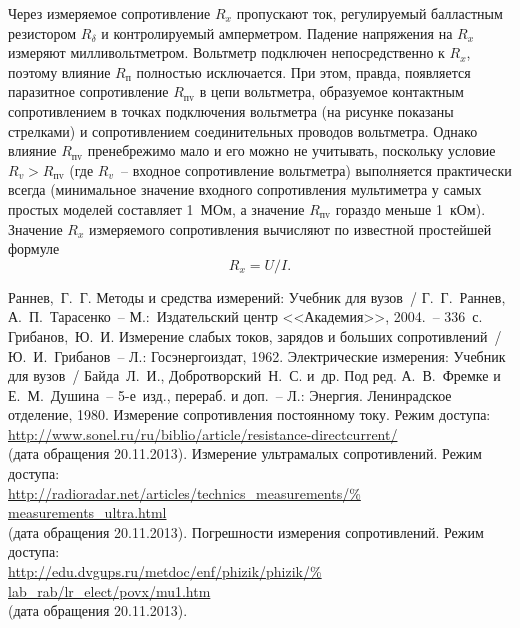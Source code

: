 \documentclass[pscyr]{hedwork}
\begin{document}
  Через измеряемое сопротивление \( R_x \) пропускают ток, регулируемый
  балластным резистором \( R_\delta \) и контролируемый амперметром. Падение
  напряжения на \( R_x \) измеряют милливольтметром. Вольтметр подключен
  непосредственно к \( R_x \), поэтому влияние \( R_\text{п} \) полностью
  исключается. При этом, правда, появляется паразитное сопротивление
  \( R_\text{пv} \) в цепи вольтметра, образуемое контактным сопротивлением в
  точках подключения вольтметра (на рисунке показаны стрелками) и сопротивлением
  соединительных проводов вольтметра. Однако влияние \( R_\text{пv} \)
  пренебрежимо мало и его можно не учитывать, поскольку условие
  \( R_v > R_\text{пv} \) (где \( R_v \)~-- входное сопротивление вольтметра)
  выполняется практически всегда (минимальное значение входного сопротивления
  мультиметра у самых простых моделей составляет 1~МОм, а значение
  \( R_\text{пv} \) гораздо меньше 1~кОм). Значение \( R_x \) измеряемого
  сопротивления вычисляют по известной простейшей формуле
  \[
    R_x = U / I.
  \]

  \pagebreak

  \begin{thebibliography}{9}
     Раннев,~Г.~Г. Методы и средства измерений: Учебник для вузов~/
      Г.~Г.~Раннев, А.~П.~Тарасенко~-- М.:~Издательский центр <<Академия>>,
      2004.~-- 336~с.
     Грибанов,~Ю.~И. Измерение слабых токов, зарядов и больших
      сопротивлений~/ Ю.~И.~Грибанов~-- Л.: Госэнергоиздат, 1962.
     Электрические измерения: Учебник для вузов~/ Байда~Л.~И.,
      Добротворский~Н.~С. и~др. Под ред. А.~В.~Фремке и Е.~М.~Душина~--
      5-е~изд., перераб. и доп.~-- Л.: Энергия. Ленинрадское отделение, 1980.
     Измерение сопротивления постоянному току. Режим доступа:\\
      \url{http://www.sonel.ru/ru/biblio/article/resistance-directcurrent/}\\
      (дата обращения 20.11.2013).
     Измерение ультрамалых сопротивлений. Режим доступа:\\
      \url{http://radioradar.net/articles/technics_measurements/%
      measurements_ultra.html}\\
      (дата обращения 20.11.2013).
     Погрешности измерения сопротивлений. Режим доступа:\\
      \url{http://edu.dvgups.ru/metdoc/enf/phizik/phizik/%
      lab_rab/lr_elect/povx/mu1.htm}\\
      (дата обращения 20.11.2013).
  \end{thebibliography}
\end{document}
